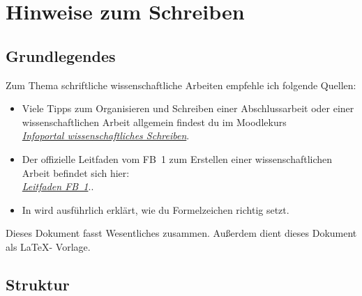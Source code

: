 \section*{Hinweise zum Schreiben}



\subsection{Grundlegendes}
Zum Thema schriftliche wissenschaftliche Arbeiten empfehle ich folgende Quellen: 

\begin{itemize}
    \item Viele Tipps zum Organisieren und Schreiben einer  Abschlussarbeit oder einer wissenschaftlichen Arbeit allgemein findest du im Moodlekurs\\ 
    \href{https://moodle.htw-berlin.de/course/view.php?id=17639}{\emph{Infoportal wissenschaftliches Schreiben}}.
    \item Der offizielle Leitfaden vom FB~1 zum Erstellen einer wissenschaftlichen Arbeit befindet sich hier: \\\href{https://www.f1.htw-berlin.de/fileadmin/HTW/Zentral/FB/FB1/Leitfaden_zur_Erstellung_einer_Wiss.-Arbeit_neu.pdf}{\emph{Leitfaden FB~1}}.\cite{fb1leitfaden}.
    \item In \cite{volkerformeln} wird ausführlich erklärt, wie du Formelzeichen richtig setzt.
\end{itemize}
Dieses Dokument fasst Wesentliches zusammen. 
Außerdem dient dieses Dokument als \LaTeX- Vorlage.

\subsection{Struktur}\label{sec:Struktur}

